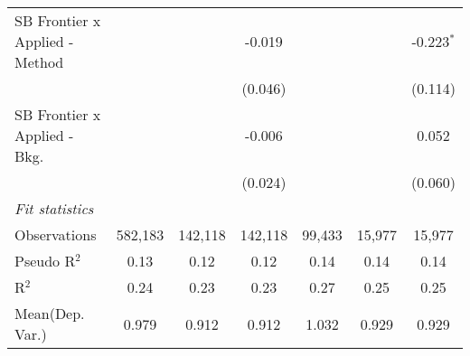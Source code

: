 \begin{tabular}{lcccccc}
   SB Frontier x Applied - Method &               &               & -0.019       &               &              & -0.223$^{*}$\\   
                                  &               &               & (0.046)      &               &              & (0.114)\\   
   SB Frontier x Applied - Bkg.   &               &               & -0.006       &               &              & 0.052\\   
                                  &               &               & (0.024)      &               &              & (0.060)\\   
   \midrule
   \emph{Fit statistics}\\
   Observations                   & 582,183       & 142,118       & 142,118      & 99,433        & 15,977       & 15,977\\  
   Pseudo R$^2$                   & 0.13          & 0.12          & 0.12         & 0.14          & 0.14         & 0.14\\  
   R$^2$                          & 0.24          & 0.23          & 0.23         & 0.27          & 0.25         & 0.25\\  
Mean(Dep. Var.) & 0.979 & 0.912 & 0.912 & 1.032 & 0.929 & 0.929 \\
   

\end{tabular}
